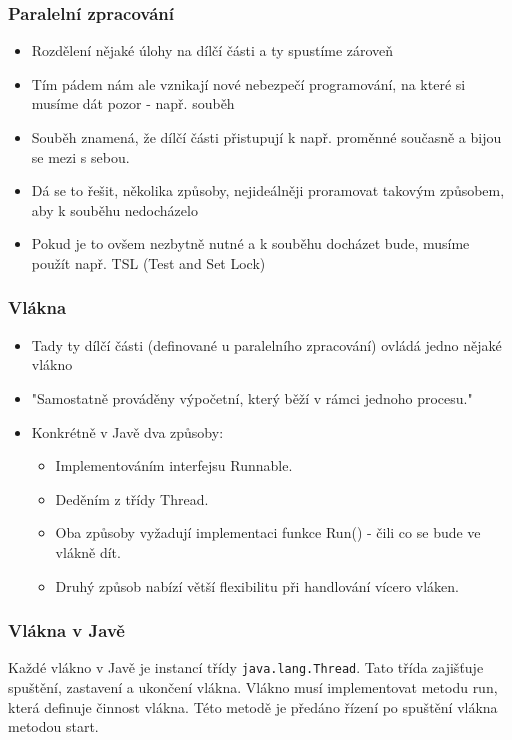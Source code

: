 \documentclass[10pt,a4paper]{article}
\begin{document}
\subsubsection{Paralelní zpracování}
\begin{itemize}
\item Rozdělení nějaké úlohy na dílčí části a ty spustíme zároveň
\item Tím pádem nám ale vznikají nové nebezpečí programování, na které si musíme dát pozor - např. souběh
\item Souběh znamená, že dílčí části přistupují k např. proměnné současně a bijou se mezi s sebou.
\item Dá se to řešit, několika způsoby, nejideálněji proramovat takovým způsobem, aby k souběhu nedocházelo
\item Pokud je to ovšem nezbytně nutné a k souběhu docházet bude, musíme použít např. TSL (Test and Set Lock)
\end{itemize}
\subsubsection{Vlákna}
\begin{itemize}
\item Tady ty dílčí části (definované u paralelního zpracování) ovládá jedno nějaké vlákno
\item "Samostatně prováděny výpočetní, který běží v rámci jednoho procesu."
\item Konkrétně v Javě dva způsoby:
\begin{itemize}
\item Implementováním interfejsu Runnable.
\item Deděním z třídy Thread.
\item Oba způsoby vyžadují implementaci funkce Run() - čili co se bude ve vlákně dít.
\item Druhý způsob nabízí větší flexibilitu při handlování vícero vláken.
\end{itemize}
\end{itemize}
\subsubsection{Vlákna v Javě}
Každé vlákno v Javě je instancí třídy \texttt{java.lang.Thread}. Tato třída zajišťuje spuštění, zastavení a ukončení vlákna. Vlákno musí implementovat metodu run, která definuje činnost vlákna. Této metodě je předáno řízení po spuštění vlákna metodou start.
\end{document}
